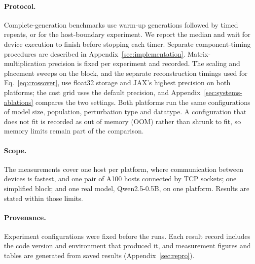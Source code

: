 \paragraph{Protocol.} Complete-generation benchmarks use \GenWarmup{} warm-up generations
followed by \GenRepeats{} timed repeats, or \BoundaryRepeats{} for the host-boundary experiment. We report the
median and wait for device execution to finish before stopping each timer. Separate
component-timing procedures are described in Appendix~\ref{sec:implementation}.
Matrix-multiplication precision is fixed per experiment and recorded. The
scaling and placement sweeps on the block, and the separate reconstruction timings used
for Eq.~\ref{eq:crossover}, use float32 storage and JAX's highest precision on both
platforms; the cost grid uses the default precision, and
Appendix~\ref{sec:systems-ablations} compares the two settings. Both platforms run the
same configurations of model size, population, perturbation type and datatype. A
configuration that does not fit is recorded as out of memory (OOM) rather than shrunk to
fit, so memory limits remain part of the comparison.

\paragraph{Scope.} The measurements cover one host per platform, where communication
between devices is fastest, and one pair of A100 hosts connected by TCP sockets; one
simplified block; and one real model, Qwen2.5-0.5B, on one platform. Results are stated
within those limits.

\paragraph{Provenance.} Experiment configurations were fixed before the runs. Each result
record includes the code version and environment that produced it, and measurement figures
and tables are generated from saved results (Appendix~\ref{sec:repro}).
